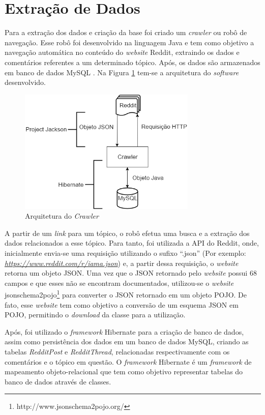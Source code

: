 \section{Extração de Dados}
\label{cap:Extracao}

Para a extração dos dados e criação da base foi
criado um \textit{crawler} ou robô de navegação. Esse robô foi desenvolvido na
linguagem Java e tem como objetivo a navegação automática no conteúdo do
\textit{website} Reddit, extraindo os dados e comentários referentes a um
determinado tópico. Após, os dados são armazenados em banco de dados MySQL
\cite{Widenius:2002:MRM:560480}.
Na Figura \ref{fig:crawler} tem-se a arquitetura do \textit{software}
desenvolvido.

\begin{figure}[htbp]
\centering
\includegraphics[height=225px]{imagens/arquitetura.png}
\caption{Arquitetura do \textit{Crawler}}
\label{fig:crawler}
\end{figure}

A partir de um \textit{link} para um tópico, o robô efetua uma busca e a
extração dos dados relacionados a esse tópico. Para tanto, foi utilizada a
\ac{API} do Reddit, onde, inicialmente envia-se uma requisição utilizando o
sufixo ``.json'' (Por exemplo:
\textit{\url{https://www.reddit.com/r/iama.json}}) e, a partir dessa requisição,
o \textit{website} retorna um objeto \ac{JSON}. Uma vez que o \ac{JSON}
retornado pelo \textit{website} possui 68 campos e que esses não se encontram
documentados, utilizou-se o \textit{website}
jsonschema2pojo\footnote{http://www.jsonschema2pojo.org/} para converter o JSON
retornado em um objeto \ac{POJO}. De fato, esse \textit{website} tem como
objetivo a conversão de um esquema \ac{JSON} em \ac{POJO}, permitindo o
\textit{download} da classe para a utilização.

Após, foi utilizado o \textit{framework} Hibernate
\cite{Iverson:2004:HJD:1044870} para a criação de banco de dados, assim como
persistência dos dados em um banco de dados MySQL, criando as tabelas
\textit{RedditPost} e \textit{RedditThread}, relacionadas respectivamente com
os comentários e o tópico em questão.
O \textit{framework} Hibernate é um \textit{framework} de mapeamento objeto-relacional que tem como objetivo representar tabelas do
banco de dados através de classes.

